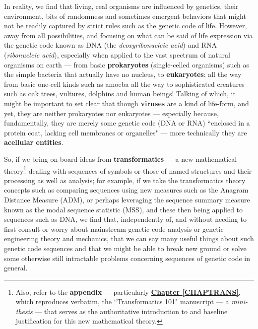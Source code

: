 \documentclass[a4paper, 18pt]{book} %
\begin{document}
In reality, we find that living, real organisms are influenced by genetics, their environment, bits of randomness and sometimes emergent behaviors that might not be readily captured by strict rules such as the genetic code of life. However, away from all possibilities, and focusing on what can be said of life expression via the genetic code known as DNA (the \textit{deoxyribonucleic acid}) and RNA (\textit{ribonucleic acid}), especially when applied to the vast spectrum of natural organisms on earth --- from basic \textbf{prokaryotes} (single-celled organisms) such as the simple bacteria that actually have no nucleus\cite{bioexplorer2025}, to  \textbf{eukaryotes}; all the way from basic one-cell kinds such as amoeba\cite{kang2017deep} all the way to sophisticated creatures such as oak trees, vultures, dolphins and human beings! Talking of which, it might be important to set clear that though \textbf{viruses} are a kind of life-form\cite{libretexts2025viruses}, and yet, they are neither prokaryotes nor eukaryotes --- especially because, fundamentally, they are merely some genetic code (DNA or RNA) ``enclosed in a protein coat, lacking cell membranes or organelles"\cite{libretexts2025viruses} --- more technically they are \textbf{acellular entities}.

So, if we bring on-board ideas from \textbf{transformatics}\cite{transformatics}\cite{Lutalo2025_transformatics_thesis} --- a new mathematical theory\footnote{Also, refer to the \textbf{appendix} --- particularly \textbf{\hyperref[CHAPTRANS]{Chapter \ref{CHAPTRANS}}}, which reproduces verbatim, the ``Transformatics 101" manuscript --- a \textit{mini-thesis} --- that serves as the authoritative introduction to and baseline justification for this new mathematical theory.} dealing with sequences of symbols or those of named structures and their processing as well as analysis; for example, if we take the transformatics theory concepts such as comparing sequences using new measures such as the Anagram Distance Measure (ADM), or perhaps leveraging the sequence summary measure known as the modal sequence statistic (MSS), and these then being applied to sequences such as DNA, we find that, independently of, and without needing to first consult or worry about mainstream genetic code analysis or genetic engineering theory and mechanics, that we can say many useful things about such genetic code sequences and that we might be able to break new ground or solve some otherwise still intractable problems concerning sequences of genetic code in general.
\end{document}
